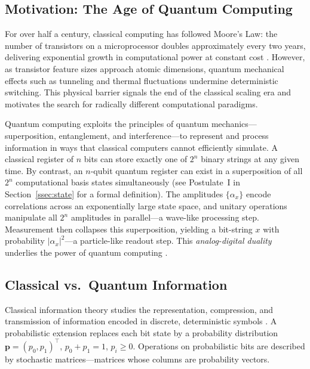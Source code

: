 \documentclass[aps, reprint, twocolumn, superscriptaddress, floatfix]{revtex4-2}
\begin{document}
\subsection{Motivation: The Age of Quantum Computing}
\label{ssec:motivation}

For over half a century, classical computing has followed Moore's Law: the
number of transistors on a microprocessor doubles approximately every two years,
delivering exponential growth in computational power at constant cost
\cite{preskill2018quantum}.  However, as transistor feature sizes approach
atomic dimensions, quantum mechanical effects such as tunneling and thermal
fluctuations undermine deterministic switching.  This physical barrier signals
the end of the classical scaling era and motivates the search for radically
different computational paradigms.

Quantum computing exploits the principles of quantum mechanics---superposition,
entanglement, and interference---to represent and process information in ways
that classical computers cannot efficiently simulate.  A classical register of
$n$ bits can store exactly one of $2^n$ binary strings at any given time.  By
contrast, an $n$-qubit quantum register can exist in a superposition of all
$2^n$ computational basis states simultaneously (see Postulate~I in 
Section~\ref{ssec:state} for a formal definition).
The amplitudes $\{\alpha_x\}$ encode correlations across an exponentially large
state space, and unitary operations manipulate all $2^n$ amplitudes in
parallel---a wave-like processing step.  Measurement then collapses this
superposition, yielding a bit-string $x$ with probability $|\alpha_x|^2$---a
particle-like readout step.  This \emph{analog-digital duality} underlies the
power of quantum computing \cite{nielsen2010quantum}.

\subsection{Classical vs.\ Quantum Information}
\label{ssec:classical-vs-quantum}

Classical information theory studies the representation, compression, and
transmission of information encoded in discrete, deterministic symbols
\cite{wilde2017quantum}.  A probabilistic extension replaces each bit state by a
probability distribution $\mathbf{p} = (p_0, p_1)^\top$, $p_0 + p_1 = 1$,
$p_i \ge 0$.  Operations on probabilistic bits are described by stochastic
matrices---matrices whose columns are probability vectors.
\end{document}
